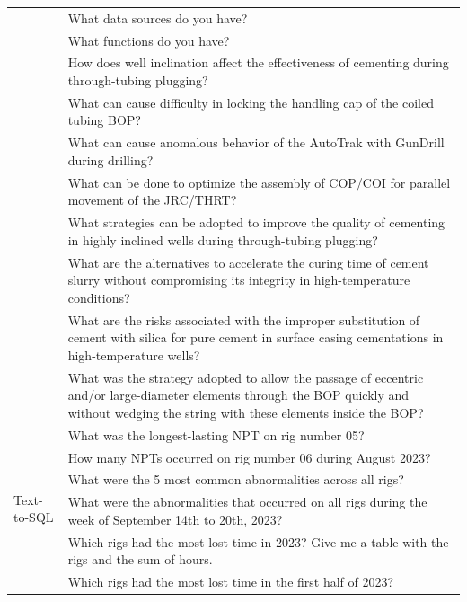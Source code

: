 \begin{table}[h]
\begin{tabular}{|p{.1\linewidth}|p{.9\linewidth}|}
                & What data sources do you have? \\ \cline{2-2}
                & What functions do you have? \\ \cline{2-2}
                & How does well inclination affect the effectiveness of cementing during through-tubing plugging? \\ \cline{2-2}
                & What can cause difficulty in locking the handling cap of the coiled tubing BOP? \\ \cline{2-2}
                & What can cause anomalous behavior of the AutoTrak with GunDrill during drilling? \\ \cline{2-2}
                & What can be done to optimize the assembly of COP/COI for parallel movement of the JRC/THRT? \\ \cline{2-2}
                & What strategies can be adopted to improve the quality of cementing in highly inclined wells during through-tubing plugging? \\ \cline{2-2}
                & What are the alternatives to accelerate the curing time of cement slurry without compromising its integrity in high-temperature conditions? \\ \cline{2-2}
                & What are the risks associated with the improper substitution of cement with silica for pure cement in surface casing cementations in high-temperature wells? \\ \cline{2-2}
                & What was the strategy adopted to allow the passage of eccentric and/or large-diameter elements through the BOP quickly and without wedging the string with these elements inside the BOP? \\ \cline{2-2}
                \hline                
                \multirow{15}{*}{Text-to-SQL} & What was the longest-lasting NPT on rig number 05? \\ \cline{2-2}
                & How many NPTs occurred on rig number 06 during August 2023? \\ \cline{2-2}
                & What were the 5 most common abnormalities across all rigs? \\ \cline{2-2}
                & What were the abnormalities that occurred on all rigs during the week of September 14th to 20th, 2023? \\ \cline{2-2}
                & Which rigs had the most lost time in 2023? Give me a table with the rigs and the sum of hours. \\ \cline{2-2}
                & Which rigs had the most lost time in the first half of 2023? \\ \cline{2-2}

\end{tabular}
\end{table}
